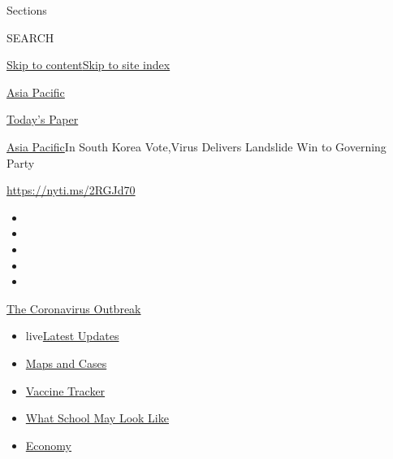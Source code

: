 Sections

SEARCH

\protect\hyperlink{site-content}{Skip to
content}\protect\hyperlink{site-index}{Skip to site index}

\href{https://www.nytimes3xbfgragh.onion/section/world/asia}{Asia
Pacific}

\href{https://myaccount.nytimes3xbfgragh.onion/auth/login?response_type=cookie\&client_id=vi}{}

\href{https://www.nytimes3xbfgragh.onion/section/todayspaper}{Today's
Paper}

\href{/section/world/asia}{Asia Pacific}\textbar{}​In South Korea Vote,
​Virus Delivers Landslide Win to Governing Party

\url{https://nyti.ms/2RGJd70}

\begin{itemize}
\item
\item
\item
\item
\item
\end{itemize}

\href{https://www.nytimes3xbfgragh.onion/news-event/coronavirus?action=click\&pgtype=Article\&state=default\&region=TOP_BANNER\&context=storylines_menu}{The
Coronavirus Outbreak}

\begin{itemize}
\tightlist
\item
  live\href{https://www.nytimes3xbfgragh.onion/2020/08/02/world/coronavirus-updates.html?action=click\&pgtype=Article\&state=default\&region=TOP_BANNER\&context=storylines_menu}{Latest
  Updates}
\item
  \href{https://www.nytimes3xbfgragh.onion/interactive/2020/us/coronavirus-us-cases.html?action=click\&pgtype=Article\&state=default\&region=TOP_BANNER\&context=storylines_menu}{Maps
  and Cases}
\item
  \href{https://www.nytimes3xbfgragh.onion/interactive/2020/science/coronavirus-vaccine-tracker.html?action=click\&pgtype=Article\&state=default\&region=TOP_BANNER\&context=storylines_menu}{Vaccine
  Tracker}
\item
  \href{https://www.nytimes3xbfgragh.onion/interactive/2020/07/29/us/schools-reopening-coronavirus.html?action=click\&pgtype=Article\&state=default\&region=TOP_BANNER\&context=storylines_menu}{What
  School May Look Like}
\item
  \href{https://www.nytimes3xbfgragh.onion/live/2020/07/31/business/stock-market-today-coronavirus?action=click\&pgtype=Article\&state=default\&region=TOP_BANNER\&context=storylines_menu}{Economy}
\end{itemize}

